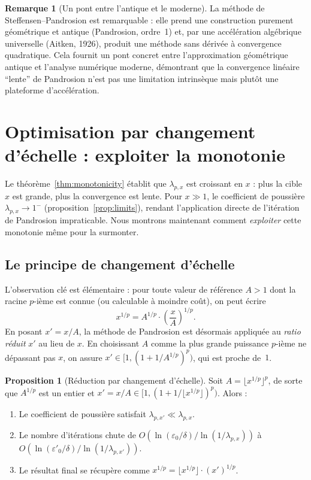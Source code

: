 \documentclass[11pt,a4paper]{article}
\theoremstyle{definition}
\newtheorem{proposition}{Proposition}[section]
\newtheorem{remark}{Remarque}[section]
\newcommand{\eps}{\varepsilon}
\begin{document}
\begin{remark}[Un pont entre l'antique et le moderne]
La méthode de Steffensen--Pandrosion est remarquable : elle prend une construction purement géométrique et antique (Pandrosion, ordre~1) et, par une accélération algébrique universelle (Aitken, 1926), produit une méthode sans dérivée à convergence quadratique. Cela fournit un pont concret entre l'approximation géométrique antique et l'analyse numérique moderne, démontrant que la convergence linéaire ``lente'' de Pandrosion n'est pas une limitation intrinsèque mais plutôt une plateforme d'accélération.
\end{remark}

\section{Optimisation par changement d'échelle : exploiter la monotonie}
\label{sec:scaling}

Le théorème~\ref{thm:monotonicity} établit que $\lambda_{p,x}$ est croissant en $x$ : plus la cible $x$ est grande, plus la convergence est lente. Pour $x \gg 1$, le coefficient de poussière $\lambda_{p,x} \to 1^-$ (proposition~\ref{prop:limits}), rendant l'application directe de l'itération de Pandrosion impraticable. Nous montrons maintenant comment \emph{exploiter} cette monotonie même pour la surmonter.

\subsection{Le principe de changement d'échelle}

L'observation clé est élémentaire : pour toute valeur de référence $A > 1$ dont la racine $p$-ième est connue (ou calculable à moindre coût), on peut écrire
\begin{equation}
  \label{eq:scaling}
  x^{1/p} = A^{1/p} \cdot \left(\frac{x}{A}\right)^{\!1/p}.
\end{equation}
En posant $x' = x/A$, la méthode de Pandrosion est désormais appliquée au \emph{ratio réduit} $x'$ au lieu de $x$. En choisissant $A$ comme la plus grande puissance $p$-ième ne dépassant pas $x$, on assure $x' \in [1, (1+1/A^{1/p})^p)$, qui est proche de~$1$.

\begin{proposition}[Réduction par changement d'échelle]
\label{prop:scaling}
Soit $A = \lfloor x^{1/p} \rfloor^p$, de sorte que $A^{1/p}$ est un entier et $x' = x/A \in [1, (1+1/\lfloor x^{1/p}\rfloor)^p)$. Alors :
\begin{enumerate}
  \item Le coefficient de poussière satisfait $\lambda_{p,x'} \ll \lambda_{p,x}$.
  \item Le nombre d'itérations chute de $O(\ln(\eps_0/\delta) / \ln(1/\lambda_{p,x}))$ à $O(\ln(\eps'_0/\delta) / \ln(1/\lambda_{p,x'}))$.
  \item Le résultat final se récupère comme $x^{1/p} = \lfloor x^{1/p} \rfloor \cdot (x')^{1/p}$.
\end{enumerate}
\end{proposition}
\end{document}
